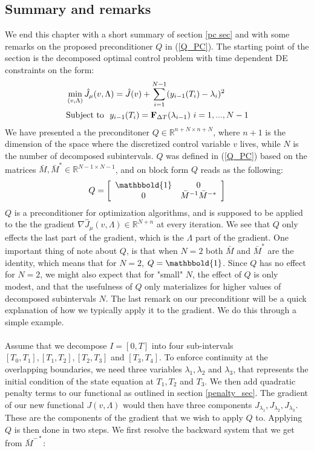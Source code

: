 \documentclass[11pt,a4paper]{article}
\begin{document}
\subsection{Summary and remarks}
We end this chapter with a short summary of section \ref{pc sec} and with some remarks on the proposed preconditioner $Q$ in (\ref{Q_PC}). The starting point of the section is the decomposed optimal control problem with time dependent DE constraints on the form:
\begin{align}
&\min_{(v,\Lambda)}\hat J_{\mu}(v,\Lambda) =\hat{J}(v)+ \sum_{i=1}^{N-1} (y_{i-1}(T_{i})-\lambda_{i})^2  \\
&\textrm{Subject to } \ y_{i-1}(T_{i}) = \bold F_{\Delta T}(\lambda_{i-1}) \ i=1,...,N-1 
\end{align}
We have presented a the preconditoner $Q\in\mathbb{R}^{n+N\times n+N}$, where $n+1$ is the dimension of the space where the discretized control variable $v$ lives, while $N$ is the number of decomposed subintervals. $Q$ was defined in (\ref{Q_PC}) based on the matrices $\bar M,\bar M^*\in\mathbb{R}^{N-1\times N-1}$, and on block form $Q$ reads as the following:
\begin{align*}
Q = \left[ \begin{array}{cc}
	\mathbbold{1} & 0 \\
	0 &  \bar{M}^{-1}\bar{M}^{-*}\\
	\end{array} \right] 
\end{align*}
$Q$ is a preconditioner for optimization algorithms, and is supposed to be applied to the the gradient $\nabla \hat J_{\mu}(v,\Lambda)\in\mathbb{R}^{N+n}$ at every iteration. We see that $Q$ only effects the last part of the gradient, which is the $\Lambda$ part of the gradient. One important thing of note about $Q$, is that when $N=2$ both $\bar M$ and $\bar M^*$ are the identity, which means that for $N=2$, $Q=\mathbbold{1}$. Since $Q$ has no effect for $N=2$, we might also expect that for "small" $N$, the effect of $Q$ is only modest, and that the usefulness of $Q$ only materializes for higher values of decomposed subintervals $N$. The last remark on our preconditionr will be a quick explanation of how we typically apply it to the gradient. We do this through a simple example.   
\\
\\
Assume that we decompose $I=[0,T]$ into four sub-intervals $[T_0,T_1], [T_1,T_2], [T_2,T_3]$ and $[T_3,T_4]$. To enforce continuity at the overlapping boundaries, we need three variables $\lambda_1,\lambda_2$ and $\lambda_3$, that represents the initial condition of the state equation at $T_1,T_2$ and $T_3$. We then add quadratic penalty terms to our functional as outlined in section \ref{penalty_sec}. The gradient of our new functional $J(v,\Lambda)$ would then have three components $J_{\lambda_1}, J_{\lambda_2}, J_{\lambda_3}$. These are the components of the gradient that we wish to apply $Q$ to. Applying $Q$ is then done in two steps. We first resolve the backward system that we get from $\bar M^{-*}$:
\end{document}
